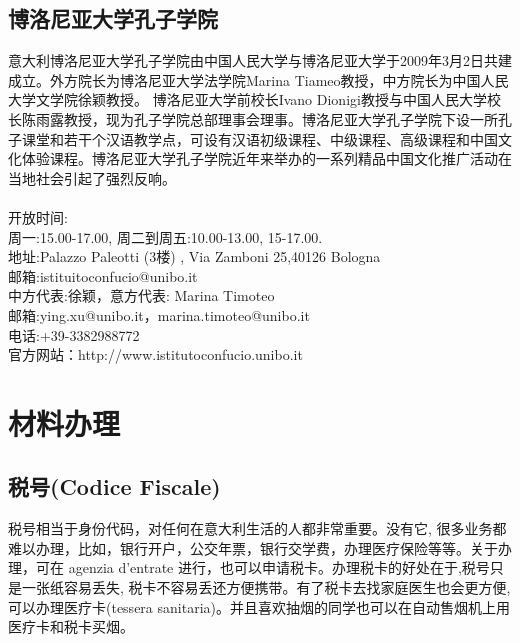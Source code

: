 \documentclass[3pt,a5paper,openright,twoside]{book}
\begin{document}
\newpage

\section{博洛尼亚大学孔子学院}

意大利博洛尼亚大学孔子学院由中国人民大学与博洛尼亚大学于2009年3月2日共建成立。外方院长为博洛尼亚大学法学院Marina Tiameo教授，中方院长为中国人民大学文学院徐颖教授。 博洛尼亚大学前校长Ivano Dionigi教授与中国人民大学校长陈雨露教授，现为孔子学院总部理事会理事。博洛尼亚大学孔子学院下设一所孔子课堂和若干个汉语教学点，可设有汉语初级课程、中级课程、高级课程和中国文化体验课程。博洛尼亚大学孔子学院近年来举办的一系列精品中国文化推广活动在当地社会引起了强烈反响。\\\\
 \noindent 开放时间:\\
周一:15.00-17.00, 周二到周五:10.00-13.00, 15-17.00.\\
地址:Palazzo Paleotti (3楼) , Via Zamboni 25,40126 Bologna \\
邮箱:istituitoconfucio@unibo.it \\
中方代表:徐颖，意方代表: Marina Timoteo \\
邮箱:ying.xu@unibo.it，marina.timoteo@unibo.it \\
电话:+39-3382988772 \\
官方网站：http://www.istitutoconfucio.unibo.it



% 
%
%
%


\chapter{材料办理}                 %


\section{税号(Codice Fiscale)}
税号相当于身份代码，对任何在意大利生活的人都非常重要。没有它, 很多业务都难以办理，比如，银行开户，公交年票，银行交学费，办理医疗保险等等。关于办理，可在 agenzia d'entrate 进行，也可以申请税卡。办理税卡的好处在于,税号只是一张纸容易丢失, 税卡不容易丢还方便携带。有了税卡去找家庭医生也会更方便,可以办理医疗卡(tessera
sanitaria)。并且喜欢抽烟的同学也可以在自动售烟机上用医疗卡和税卡买烟。
\end{document}
